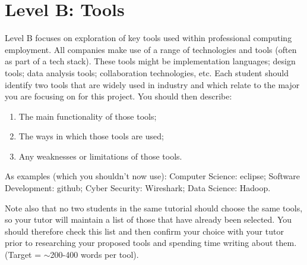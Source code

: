 \documentclass[a4paper, 11pt]{report}
\begin{document}
\newpage
\section{Level B: Tools}

Level B focuses on exploration of key tools used within professional computing employment. All companies make use of a range of technologies and tools (often as part of a tech stack). These tools might be implementation languages; design tools; data analysis tools; collaboration technologies, etc. Each student should identify two tools that are widely used in industry and which relate to the major you are focusing on for this project. You should then describe:
\begin{enumerate}
	\item The main functionality of those tools;
	\item The ways in which those tools are used;
	\item Any weaknesses or limitations of those tools.
\end{enumerate}

As examples (which you shouldn't now use): Computer Science: eclipse; Software Development: github; Cyber Security: Wireshark; Data Science: Hadoop.

Note also that no two students in the same tutorial should choose the same tools, so your tutor will maintain a list of those that have already been selected. You should therefore check this list and then confirm your choice with your tutor prior to researching your proposed tools and spending time writing about them. (Target = $\sim$200-400 words per tool).
\end{document}
